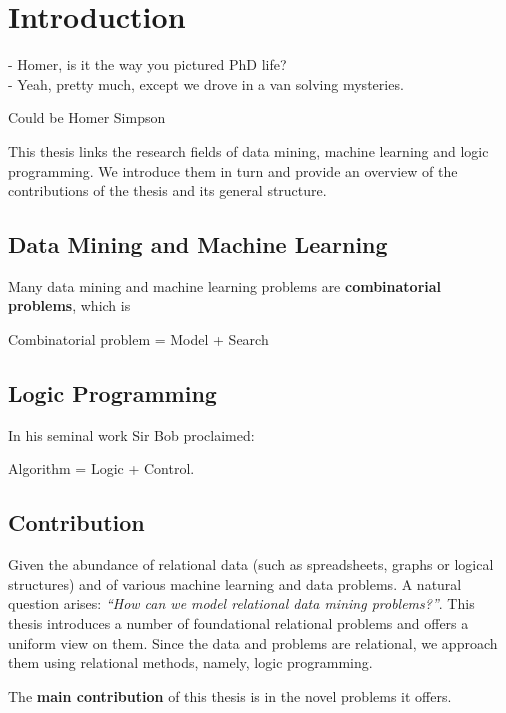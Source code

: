 \chapter{Introduction}\label{ch:introduction}
\epigraph{
- Homer, is it the way you pictured PhD life?\\
- Yeah, pretty much, except we drove in a van solving mysteries.
}{Could be Homer Simpson}

\begin{addmargin}[2em]{2em}
This thesis links the research fields of data mining, machine learning
and logic
programming. We introduce them in turn and provide an overview of the
contributions of the thesis and
its general structure.
\end{addmargin}

\section{Data Mining and Machine Learning}

Many data mining and machine learning problems are \textbf{combinatorial problems}, which
is 

\begin{center}
  Combinatorial problem = Model + Search
\end{center}

\section{Logic Programming}
In his seminal work Sir Bob \textcite{kowalski} proclaimed:
\begin{center}
  Algorithm = Logic + Control.
\end{center}

\section{Contribution}
Given the abundance of relational data (such as spreadsheets, graphs
or logical structures) and of various machine learning and data
problems. A natural question arises: \textit{``How can we model
relational data mining problems?''}. This thesis introduces a number
of foundational relational problems and offers a uniform view on them.
Since the data and problems are relational, we approach them using
relational methods, namely, logic programming.

The \textbf{main contribution} of this thesis is in the novel problems
it offers.

